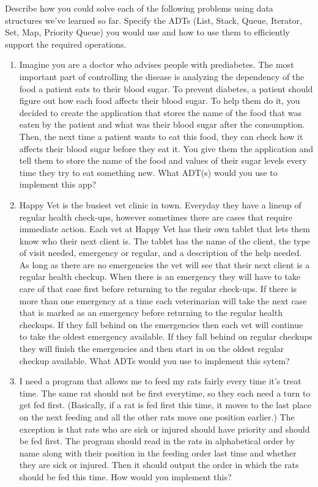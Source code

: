 \documentclass{article}
\begin{document}
Describe how you could solve each of the following problems using data
structures we've learned so far.
Specify the ADTs (List, Stack, Queue, Iterator, Set, Map, Priority Queue) you
would use and how to use them to efficiently support the required
operations.

\begin{enumerate}

\item
Imagine you are a doctor who advises people with prediabetes. The most
important part of controlling the
disease is analyzing the dependency of the food a patient eats to
their blood sugar. To prevent diabetes, a
patient should figure out how each food affects their blood
sugar. To help them do it, you decided to
create the application that stores the name of the food that was eaten
by the patient and what was their
blood sugar after the consumption. Then, the next time a patient wants
to eat this food, they can check
how it affects their blood sugar before they eat it. You give them the
application and tell them to store the
name of the food and values of their sugar levels every time they try
to eat something new.
What ADT(s) would you use to implement this app?

\item 
Happy Vet is the busiest vet clinic in town. Everyday they have a
lineup of regular health check-ups, however sometimes there are cases
that require immediate action. Each vet at Happy Vet has their own
tablet that lets them know who their next client is. The tablet has
the name of the client, the type of visit needed, emergency or
regular, and a description of the help needed. As long as there are no
emergencies the vet will see that their next client is a regular
health checkup. When there is an emergency they will have to take care
of that case first before returning to the regular check-ups. If there
is more than one emergency at a time each veterinarian will take the
next case that is marked as an emergency before returning to the
regular health checkups. If they fall behind on the emergencies then
each vet will continue to take the oldest emergency available. If they
fall behind on regular checkups they will finish the emergencies and
then start in on the oldest regular checkup available.
What ADTs would you use to implement this sytem?

\item 
I need a program that allows me to feed my rats fairly every
time it’s treat time. The same rat should not be first everytime, so
they each need a turn to get fed first. (Basically, if a rat is fed
first this time, it moves to the last place on the next feeding and
all the other rats move one position earlier.)
The exception is that rats who are sick or injured should have
priority and should be fed first.
The program should read in the rats in alphabetical order by name
along with their position in the feeding order last time and whether
they are sick or injured.
Then it should output the order in which the rats should be fed this
time.
How would you implement this?


\end{enumerate}
\end{document}
